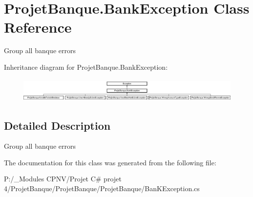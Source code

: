 \hypertarget{class_projet_banque_1_1_bank_exception}{}\section{Projet\+Banque.\+Bank\+Exception Class Reference}
\label{class_projet_banque_1_1_bank_exception}


Group all banque errors  


Inheritance diagram for Projet\+Banque.\+Bank\+Exception\+:\begin{figure}[H]
\begin{center}
\leavevmode
\includegraphics[height=1.263158cm]{class_projet_banque_1_1_bank_exception}
\end{center}
\end{figure}


\subsection{Detailed Description}
Group all banque errors 



The documentation for this class was generated from the following file\+:\begin{DoxyCompactItemize}
\item 
P\+:/\+\_\+\+Modules C\+P\+N\+V/\+Projet C\# projet 4/\+Projet\+Banque/\+Projet\+Banque/\+Projet\+Banque/Ban\+K\+Exception.\+cs\end{DoxyCompactItemize}
